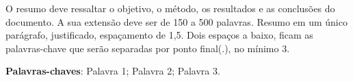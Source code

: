\begin{resumo}
O resumo deve ressaltar o objetivo, o método, os resultados e as conclusões do documento. A sua extensão deve ser de 150 a 500 palavras. Resumo em um único parágrafo, justificado, espaçamento de 1,5. Dois espaços a baixo, ficam as palavras-chave que serão separadas por ponto final(.), no mínimo 3.
\vspace{\onelineskip}
\noindent

\textbf{Palavras-chaves}: Palavra 1; Palavra 2; Palavra 3.
\end{resumo}